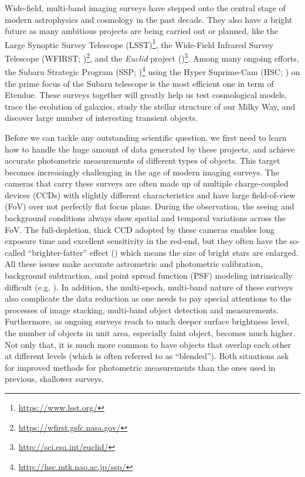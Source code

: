 \documentclass[useamsfonts]{pasj01}
\begin{document}
    Wide-field, multi-band imaging surveys have stepped onto the central stage of
    modern astrophysics and cosmology in the past decade.
    They also have a bright future as many ambitious projects are being carried out
    or planned, like the Large Synoptic Survey Telescope
    (LSST)\footnote{\url{https://www.lsst.org/}}, the Wide-Field Infrared Survey
    Telescope
    (WFIRST; \citealt{Dressler2012})\footnote{\url{https://wfirst.gsfc.nasa.gov/}},
    and the \textit{Euclid} project
    (\citealt{Laureijs2012})\footnote{\url{http://sci.esa.int/euclid/}}.
    Among many ongoing efforts, the Subaru Strategic Program
    (SSP; \citealt{HSCDR1})\footnote{\url{http://hsc.mtk.nao.ac.jp/ssp/}}
    using the Hyper Suprime-Cam (HSC; \citealt{Miyazaki2012}) on the prime focus of
    the Subaru telescope is the most efficient one in term of Etendue.
    These surveys together will greatly help us test cosmological models, trace the
    evolution of galaxies, study the stellar structure of our Milky Way, and discover
    large number of interesting transient objects.

    Before we can tackle any outstanding scientific question, we first need to learn
    how to handle the huge amount of data generated by these projects, and achieve
    accurate photometric measurements of different types of objects.
    This target becomes increasingly challenging in the age of modern imaging
    surveys.
    The cameras that carry these surveys are often made up of multiple
    charge-coupled devices (CCDs) with slightly different characteristics and have
    large field-of-view (FoV) over not perfectly flat focus plane.
    During the observation, the seeing and background conditions always show spatial
    and temporal variations across the FoV.
    The full-depletion, thick CCD adopted by these cameras enables long exposure time
    and excellent sensitivity in the red-end, but they often have the so-called
    ``brighter-fatter'' effect (\citealt{Antilogus2014}) which means the size of bright
    stars are enlarged.
    All these issues make accurate astrometric and photometric calibration,
    background subtraction, and point spread function (PSF) modeling intrinsically
    difficult (e.g. \citealt{Schlafly2012}).
    In addition, the multi-epoch, multi-band nature of these surveys also complicate
    the data reduction as one needs to pay special attentions to the processes of
    image stacking, multi-band object detection and measurements.
    Furthermore, as ongoing surveys reach to much deeper surface brightness level,
    the number of objects in unit area, especially faint object, becomes much higher.
    Not only that, it is much more common to have objects that overlap each other at
    different levels (which is often referred to as ``blended'').
    Both situations ask for improved methods for photometric measurements than the ones
    used in previous, shallower surveys.
\end{document}
